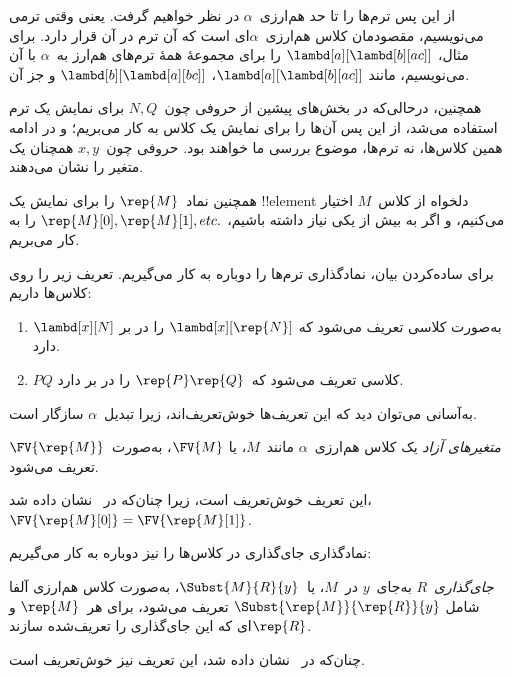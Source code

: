 \documentclass[../../../include/open-logic-section]{subfiles}
\begin{document}

از این پس ترم‌ها را تا حد هم‌ارزی~$\alpha$ در نظر خواهیم گرفت. یعنی
وقتی ترمی می‌نویسیم، مقصودمان کلاس هم‌ارزی~$\alpha$ای است که آن ترم
در آن قرار دارد. برای مثال، $\lambd[a][\lambd[b][a c]]$ را برای مجموعهٔ
همهٔ ترم‌های هم‌ارز به~$\alpha$ با آن می‌نویسیم، مانند
$\lambd[a][\lambd[b][a c]]$، $\lambd[b][\lambd[a][b c]]$ و جز آن.

همچنین، درحالی‌که در بخش‌های پیشین از حروفی چون~$N, Q$ برای نمایش یک
ترم استفاده می‌شد، از این پس آن‌ها را برای نمایش یک کلاس به کار می‌بریم؛
و در ادامه همین کلاس‌ها، نه ترم‌ها، موضوع بررسی ما خواهند بود. حروفی
چون~$x, y$ همچنان یک متغیر را نشان می‌دهند.

همچنین نماد~$\rep{M}$ را برای نمایش یک !!{element} دلخواه از کلاس~$M$
اختیار می‌کنیم، و اگر به بیش از یکی نیاز داشته باشیم،
$\rep{M}[0], \rep{M}[1], etc. $ را به کار می‌بریم.

برای ساده‌کردن بیان، نمادگذاری ترم‌ها را دوباره به کار می‌گیریم. تعریف
زیر را روی کلاس‌ها داریم:
\begin{defn}
  \begin{enumerate}
  \item $\lambd[x][N]$ به‌صورت کلاسی تعریف می‌شود که
    $\lambd[x][\rep{N}]$ را در بر دارد.
  \item $PQ$ کلاسی تعریف می‌شود که~$\rep{P}\rep{Q}$ را در بر دارد.
  \end{enumerate}
\end{defn}

به‌آسانی می‌توان دید که این تعریف‌ها خوش‌تعریف‌اند، زیرا تبدیل~$\alpha$
سازگار است.

\begin{defn} 
  \emph{متغیرهای آزاد} یک کلاس هم‌ارزی~$\alpha$ مانند~$M$، یا
  $\FV{M}$، به‌صورت~$\FV{\rep{M}}$ تعریف می‌شود.
\end{defn}

این تعریف خوش‌تعریف است، زیرا چنان‌که در~ نشان داده
شد، $\FV{\rep{M}[0]} = \FV{\rep{M}[1]}$.

نمادگذاری جای‌گذاری در کلاس‌ها را نیز دوباره به کار می‌گیریم:
\begin{defn} 
  \emph{جای‌گذاری}~$R$ به‌جای~$y$ در~$M$، یا~$\Subst{M}{R}{y}$،
  به‌صورت کلاس هم‌ارزی آلفا شامل
  $\Subst{\rep{M}}{\rep{R}}{y}$ تعریف می‌شود، برای هر~$\rep{M}$ و
  $\rep{R}$ای که این جای‌گذاری را تعریف‌شده سازند.
\end{defn}

چنان‌که در~ نشان داده شد، این تعریف نیز خوش‌تعریف است.
\end{document}
